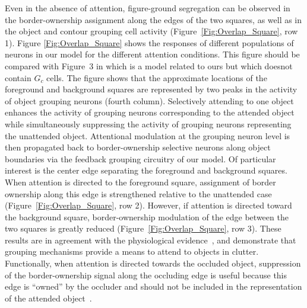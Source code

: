 Even in the absence of attention, figure-ground segregation can be
observed in the border-ownership assignment along the edges of the two
squares, as well as in the object and contour grouping cell activity
(Figure~\ref{Fig:Overlap_Square}, row 1). Figure \ref{Fig:Overlap_Square} shows the responses of different populations
of neurons in our model for the different attention conditions. This
figure should be compared with Figure~3 in \cite{Mihalas_etal11b} which is a model related to ours but which doesnot contain $G_c$ cells. The figure shows that the approximate locations of the foreground and background squares are represented by two peaks in the activity of object grouping neurons (fourth column). Selectively attending to one object enhances the activity of grouping neurons corresponding to the attended object while simultaneously suppressing the activity of grouping neurons representing the unattended object. Attentional modulation at the grouping neuron level is then propagated back to border-ownership selective neurons along object boundaries via the feedback grouping circuitry of our model. Of particular interest is the center edge separating the foreground and background squares. When attention is directed to the foreground square, assignment of border ownership along this edge is strengthened relative to the unattended case (Figure~\ref{Fig:Overlap_Square}, row 2).  However, if attention is directed toward the background square, border-ownership modulation of the edge between the two squares is greatly reduced (Figure~\ref{Fig:Overlap_Square}, row 3). These results are in agreement with the physiological evidence~\citep{Qiu_etal07}, and demonstrate that grouping mechanisms provide a means to attend to objects in clutter.  Functionally, when attention is directed towards the occluded object, suppression of the border-ownership signal along the occluding edge is useful because this edge is ``owned'' by the occluder and should not be included in the representation of the attended object~\citep{Craft_etal07}.

